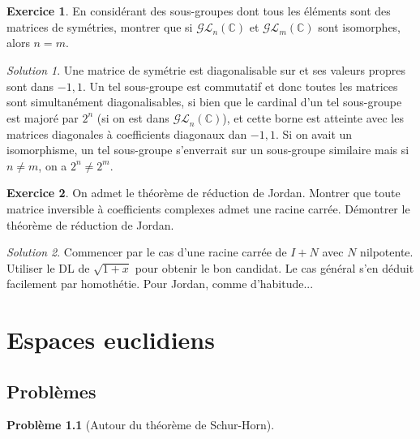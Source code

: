 \documentclass[french]{book}
\newcommand{\C}{\mathbb{C}}
\theoremstyle{definition}
\newtheorem{ex}{Exercice}[chapter]
\newtheorem{pro}{Problème}[chapter]
\theoremstyle{remark}
\newtheorem*{sol}{Solution}
\begin{document}
\begin{ex}
	En considérant des sous-groupes dont tous les éléments sont des matrices de symétries, montrer que si $\mathcal{GL}_n(\C)$ et $\mathcal{GL}_m(\C)$ sont isomorphes, alors $n=m$.
\end{ex}
\begin{sol}
	Une matrice de symétrie est diagonalisable sur et ses valeurs propres sont dans ${-1,1}$. Un tel sous-groupe est commutatif et donc toutes les matrices sont simultanément diagonalisables, si bien que le cardinal d'un tel sous-groupe est majoré par $2^n$ (si on est dans $\mathcal{GL}_n(\C)$), et cette borne est atteinte avec les matrices diagonales à coefficients diagonaux dan ${-1,1}$. Si on avait un isomorphisme, un tel sous-groupe s'enverrait sur un sous-groupe similaire mais si $n\ne m$, on a $2^n\ne 2^m$.
\end{sol}

\begin{ex}
	On admet le théorème de réduction de Jordan. Montrer que toute matrice inversible à coefficients complexes admet une racine carrée. Démontrer le théorème de réduction de Jordan.
\end{ex}
\begin{sol}
	Commencer par le cas d'une racine carrée de $I+N$ avec $N$ nilpotente. Utiliser le DL de $\sqrt{1+x}$ pour obtenir le bon candidat. Le cas général s'en déduit facilement par homothétie. Pour Jordan, comme d'habitude...
\end{sol}

\chapter{Espaces euclidiens}

\section{Problèmes}

\begin{pro}[Autour du théorème de Schur-Horn]
	
\end{pro}
\end{document}

